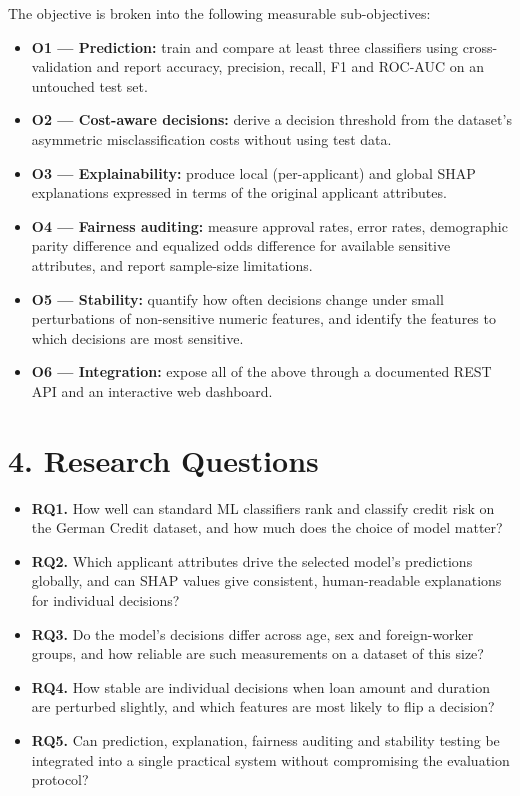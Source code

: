 \documentclass[
  11pt,
]{article}
\providecommand{\tightlist}{%
  \setlength{\itemsep}{0pt}\setlength{\parskip}{0pt}}
\begin{document}
The objective is broken into the following measurable sub-objectives:

\begin{itemize}
\tightlist
\item
  \textbf{O1 --- Prediction:} train and compare at least three
  classifiers using cross-validation and report accuracy, precision,
  recall, F1 and ROC-AUC on an untouched test set.
\item
  \textbf{O2 --- Cost-aware decisions:} derive a decision threshold from
  the dataset's asymmetric misclassification costs without using test
  data.
\item
  \textbf{O3 --- Explainability:} produce local (per-applicant) and
  global SHAP explanations expressed in terms of the original applicant
  attributes.
\item
  \textbf{O4 --- Fairness auditing:} measure approval rates, error
  rates, demographic parity difference and equalized odds difference for
  available sensitive attributes, and report sample-size limitations.
\item
  \textbf{O5 --- Stability:} quantify how often decisions change under
  small perturbations of non-sensitive numeric features, and identify
  the features to which decisions are most sensitive.
\item
  \textbf{O6 --- Integration:} expose all of the above through a
  documented REST API and an interactive web dashboard.
\end{itemize}

\hypertarget{research-questions}{%
\section{4. Research Questions}\label{research-questions}}

\begin{itemize}
\tightlist
\item
  \textbf{RQ1.} How well can standard ML classifiers rank and classify
  credit risk on the German Credit dataset, and how much does the choice
  of model matter?
\item
  \textbf{RQ2.} Which applicant attributes drive the selected model's
  predictions globally, and can SHAP values give consistent,
  human-readable explanations for individual decisions?
\item
  \textbf{RQ3.} Do the model's decisions differ across age, sex and
  foreign-worker groups, and how reliable are such measurements on a
  dataset of this size?
\item
  \textbf{RQ4.} How stable are individual decisions when loan amount and
  duration are perturbed slightly, and which features are most likely to
  flip a decision?
\item
  \textbf{RQ5.} Can prediction, explanation, fairness auditing and
  stability testing be integrated into a single practical system without
  compromising the evaluation protocol?
\end{itemize}
\end{document}
